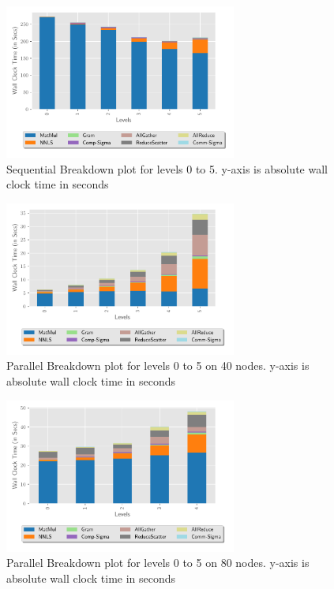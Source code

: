 \begin{figure}
\begin{center}
\includegraphics[height=2in, width=\columnwidth]{plots/synthetic_sequential_level_breakdown.pdf}
\caption{Sequential Breakdown plot for levels 0 to 5. y-axis is absolute wall clock time in seconds}
\label{fig:seqlevelbreakdown}
\end{center}
\end{figure}

\begin{figure}
\begin{center}
\includegraphics[height=2in, width=\columnwidth]{plots/synthetic_parallel_level_breakdown.pdf}
\caption{Parallel Breakdown plot for levels 0 to 5 on 40 nodes. y-axis is absolute wall clock time in seconds}
\label{fig:parallellevelbreakdown}
\end{center}
\end{figure}


\begin{figure}
\begin{center}
\includegraphics[height=2in, width=\columnwidth]{plots/realworld_parallel_level_breakdown.pdf}
\caption{Parallel Breakdown plot for levels 0 to 5 on 80 nodes. y-axis is absolute wall clock time in seconds}
\label{fig:rwparallellevelbreakdown}
\end{center}
\end{figure}


